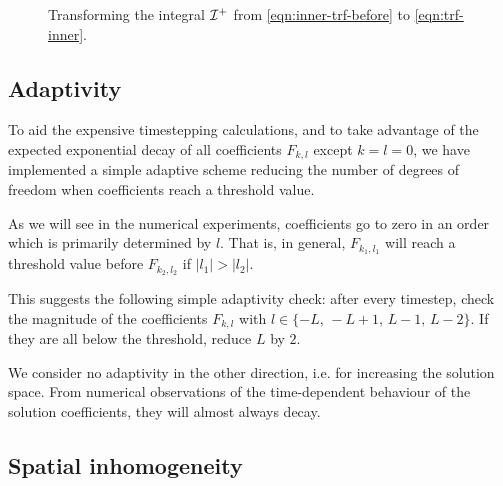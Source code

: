 \begin{figure}
    \centering
    \caption{Transforming the integral $\mathcal{I}^+$ from \eqref{eqn:inner-trf-before} to \eqref{eqn:trf-inner}.}
    \label{fig:inner-trf}
\end{figure}

\subsection{Adaptivity} \label{sec:pol-adapt}

To aid the expensive timestepping calculations, and to take advantage of the expected exponential decay of all
coefficients $F_{k,l}$ except $k=l=0$, we have implemented a simple adaptive scheme reducing the
number of degrees of freedom when coefficients reach a threshold value.

As we will see in the numerical experiments, coefficients go to zero in an order which is primarily determined
by $l$. That is, in general, $F_{k_1,l_1}$ will reach a threshold value before $F_{k_2,l_2}$ if $|l_1|>|l_2|$.

This suggests the following simple adaptivity check: after every timestep, check the magnitude of the
coefficients $F_{k,l}$ with $l\in\{-L,\,-L+1,\,L-1,\,L-2\}$. If they are all below the threshold, reduce $L$
by $2$.

We consider no adaptivity in the other direction, i.e. for increasing the solution space. From numerical
observations of the time-dependent behaviour of the solution coefficients, they will almost always decay.

\subsection{Spatial inhomogeneity} \label{sec:pol-inhom}

